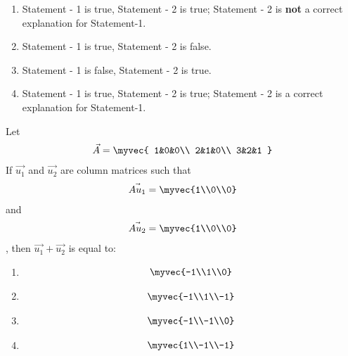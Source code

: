 	\begin{enumerate}
		\item Statement - 1 is true, Statement - 2 is true; Statement - 2 is \textbf{not} a correct explanation for Statement-1. 
	    	\item Statement - 1 is true, Statement - 2 is false. 
	    	\item Statement - 1 is false, Statement - 2 is true.
	    	\item Statement - 1 is true, Statement - 2 is true; Statement - 2 is a correct explanation for Statement-1. 
	\end{enumerate}

	\item Let \begin{align*}
	\vec{A} = \myvec{ 
		1&0&0\\
		2&1&0\\
		3&2&1
	}
	\end{align*} If $\vec{u_1}$ and $\vec{u_2}$ are column matrices such that
	\begin{align*}
		\vec{Au_1} = \myvec{1\\0\\0}
	\end{align*} and 
	\begin{align*}
		\vec{Au_2} = \myvec{1\\0\\0}
	\end{align*}, then $\vec{u_1} + \vec{u_2}$ is equal to:
	\hfill{}
        \begin{enumerate}
	    	\item \begin{align*} \myvec{-1\\1\\0} \end{align*} 
		\item \begin{align*} \myvec{-1\\1\\-1} \end{align*} 
		\item \begin{align*} \myvec{-1\\-1\\0} \end{align*}
		\item \begin{align*} \myvec{1\\-1\\-1} \end{align*} 
        \end{enumerate}

